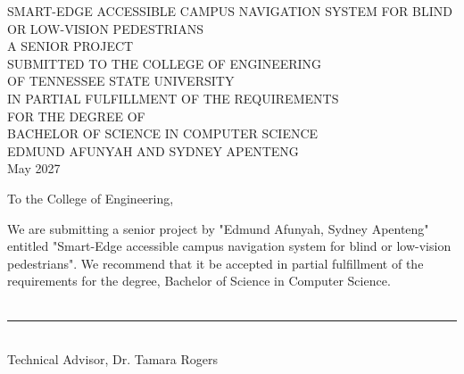 \documentclass[12pt,letterpaper,oneside,reqno]{book}
\theoremstyle{plain}
\theoremstyle{definition}
\theoremstyle{plain}
\theoremstyle{remark}
\theoremstyle{plain}
\theoremstyle{definition}
\theoremstyle{plain}
\newcommand*{\threeemdash}{\rule[0.5ex]{17em}{1.5pt}}
\newcommand*{\xdash}[1][3em]{\rule[0.5ex]{#1}{0.55pt}}
\begin{document}

\frontmatter


\thispagestyle{empty}
\doublespacing
\begin{center}

\large SMART-EDGE ACCESSIBLE CAMPUS NAVIGATION SYSTEM FOR
BLIND OR LOW-VISION PEDESTRIANS\\
\vspace{4cm}
A SENIOR PROJECT\\
SUBMITTED TO THE COLLEGE OF ENGINEERING\\
OF TENNESSEE STATE UNIVERSITY\\
IN PARTIAL FULFILLMENT OF THE REQUIREMENTS\\
FOR THE DEGREE OF \\
BACHELOR OF SCIENCE IN COMPUTER SCIENCE\\
\vspace{6cm}
EDMUND AFUNYAH AND SYDNEY APENTENG\\
May 2027\\ 
\end{center}

\hspace{1cm} 


\newpage
\noindent To the College of Engineering,

\indent We are submitting a senior project by "Edmund Afunyah, Sydney Apenteng" entitled "Smart-Edge accessible campus navigation system for blind or low-vision pedestrians". We recommend that it be accepted in partial fulfillment of the requirements for the degree, Bachelor of Science in Computer Science.\\ \\

\hspace{8cm} \threeemdash \vspace{-0.4cm} \\
\indent \hspace{8cm} Technical Advisor, Dr. Tamara Rogers\\ 
\vspace{0.3cm}
\end{document}
